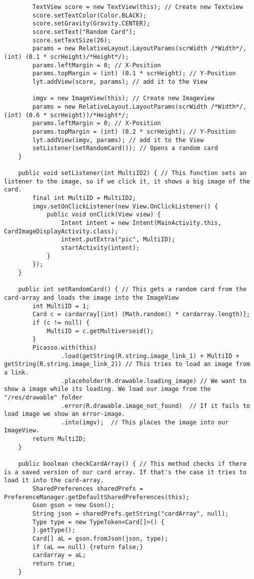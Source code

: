 \begin{lstlisting}
        TextView score = new TextView(this); // Create new Textview
        score.setTextColor(Color.BLACK);
        score.setGravity(Gravity.CENTER);
        score.setText("Random Card");
        score.setTextSize(26);
        params = new RelativeLayout.LayoutParams(scrWidth /*Width*/, (int) (0.1 * scrHeight)/*Height*/);
        params.leftMargin = 0; // X-Position
        params.topMargin = (int) (0.1 * scrHeight); // Y-Position
        lyt.addView(score, params); // add it to the View

        imgv = new ImageView(this); // Create new Imageview
        params = new RelativeLayout.LayoutParams(scrWidth /*Width*/, (int) (0.6 * scrHeight))/*Height*/;
        params.leftMargin = 0; // X-Position
        params.topMargin = (int) (0.2 * scrHeight); // Y-Position
        lyt.addView(imgv, params); // add it to the View
        setListener(setRandomCard()); // Opens a random card
    }

    public void setListener(int MultiID2) { // This function sets an listener to the image, so if we click it, it shows a big image of the card.
        final int MultiID = MultiID2;
        imgv.setOnClickListener(new View.OnClickListener() {
            public void onClick(View view) {
                Intent intent = new Intent(MainActivity.this, CardImageDisplayActivity.class);
                intent.putExtra("pic", MultiID);
                startActivity(intent);
            }
        });
    }

    public int setRandomCard() { // This gets a random card from the card-array and loads the image into the ImageView
        int MultiID = 1;
        Card c = cardarray[(int) (Math.random() * cardarray.length)];
        if (c != null) {
            MultiID = c.getMultiverseid();
        }
        Picasso.with(this)
                .load(getString(R.string.image_link_1) + MultiID +  getString(R.string.image_link_2)) // This tries to load an image from a link.
                .placeholder(R.drawable.loading_image) // We want to show a image while its loading. We load our image from the "/res/drawable" folder
                .error(R.drawable.image_not_found)  // If it fails to load image we show an error-image.
                .into(imgv);  // This places the image into our ImageView.
        return MultiID;
    }

    public boolean checkCardArray() { // This method checks if there is a saved version of our card array. If that's the case it tries to load it into the card-array.
        SharedPreferences sharedPrefs = PreferenceManager.getDefaultSharedPreferences(this);
        Gson gson = new Gson();
        String json = sharedPrefs.getString("cardArray", null);
        Type type = new TypeToken<Card[]>() {
        }.getType();
        Card[] aL = gson.fromJson(json, type);
        if (aL == null) {return false;}
        cardarray = aL;
        return true;
    }


\end{lstlisting}
